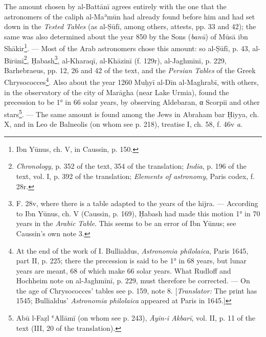 \documentclass[11pt]{article}
\newcommand{\Pg}[1]{\marginpar{\footnotesize\color{gray}#1}}
\begin{document}
\par \Pg{I 293}The amount chosen by al-Battānī agrees entirely with the one that the astronomers of the caliph al-Maʾmūn had already found before him and had set down in the \emph{Tested Tables} (as al-Ṣūfī, among others, attests, pp. 33 and 42); the same was also determined about the year 850 by the Sons (\emph{banū}) of Mūsā ibn Shākir\footnote{Ibn Yūnus, ch. V, in Caussin, p. 150.}. — Most of the Arab astronomers chose this amount: so al-Ṣūfī, p. 43, al-Bīrūnī\footnote{\emph{Chronology}, p. 352 of the text, 354 of the translation; \emph{India}, p. 196 of the text, vol. I, p. 392 of the translation; \emph{Elements of astronomy}, Paris codex, f. 28r.}, Ḥabash\footnote{F. 28v, where there is a table adapted to the years of the hijra. — According to Ibn Yūnus, ch. V (Caussin, p. 169), Ḥabash had made this motion 1° in 70 years in the \emph{Arabic Table}. This seems to be an error of Ibn Yūnus; see Caussin's own note 3.}, al-Kharaqī, al-Khāzinī (f. 129r), al-Jaghmīnī, p. 229, Barhebraeus, pp. 12, 26 and 42 of the text, and the \emph{Persian Tables} of the Greek Chrysococces\footnote{At the end of the work of I. Bullialdus, \emph{Astronomia philolaica}, Paris 1645, part II, p. 225; there the precession is said to be 1° in 68 years, but lunar years are meant, 68 of which make 66 solar years. What Rudloff and Hochheim note on al-Jaghmīnī, p. 229, must therefore be corrected. — On the age of Chrysococces' tables see p. 159, note 8. [\emph{Translator:} The print has 1545; Bullialdus' \emph{Astronomia philolaica} appeared at Paris in 1645.]}. Also about the year 1260 Muḥyī al-Dīn al-Maghrabī, with others, in the observatory of the city of Marāgha (near Lake Urmia), found the precession to be 1° in 66 solar years, by observing Aldebaran, {\greekfont α} Scorpii and other stars\footnote{Abū l-Faẓl ʿAllāmī (on whom see p. 243), \emph{Āyīn-i Akbarī}, vol. II, p. 11 of the text (III, 20 of the translation).}. — The same amount is found among the Jews in Abraham bar Ḥiyya, ch. X, and in Leo de Balneolis (on whom see p. 218), treatise I, ch. 58, f. 46v \emph{a}.\par
\end{document}
